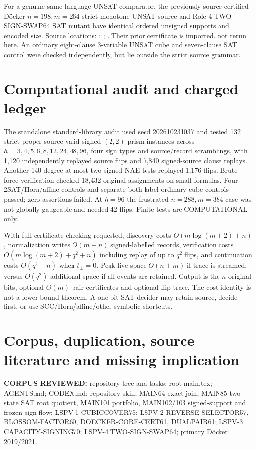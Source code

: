 \documentclass[11pt]{article}
\begin{document}
For a genuine same-language UNSAT comparator, the previously source-certified D\"ocker $n=198,m=264$ strict monotone UNSAT source and Role 4 TWO-SIGN-SWAP64 SAT mutant have identical ordered unsigned supports and encoded size. Source locations: ; ; . Their prior certificate is imported, not rerun here. An ordinary eight-clause 3-variable UNSAT cube and seven-clause SAT control were checked independently, but lie outside the strict source grammar.

\section{Computational audit and charged ledger}
The standalone standard-library audit used seed 202610231037 and tested 132 strict proper source-valid signed-$(2,2)$ prism instances across $h=3,4,5,6,8,12,24,48,96$, four sign types and source/record scramblings, with 1,120 independently replayed source flips and 7,840 signed-source clause replays. Another 140 degree-at-most-two signed NAE tests replayed 1,176 flips. Brute-force verification checked 18,432 original assignments on small formulas. Four 2SAT/Horn/affine controls and separate both-label ordinary cube controls passed; zero assertions failed. At $h=96$ the frustrated $n=288,m=384$ case was not globally gaugeable and needed 42 flips. Finite tests are COMPUTATIONAL only.

With full certificate checking requested, discovery costs $O(m\log(m+2)+n)$, normalization writes $O(m+n)$ signed-labelled records, verification costs $O(m\log(m+2)+q^2+n)$ including replay of up to $q^2$ flips, and continuation costs $O(q^2+n)$ when $t_\pm=0$. Peak live space $O(n+m)$ if trace is streamed, versus $O(q^2)$ additional space if all events are retained. Output is the $n$ original bits, optional $O(m)$ pair certificates and optional flip trace. The cost identity is not a lower-bound theorem. A one-bit SAT decider may retain source, decide first, or use SCC/Horn/affine/other symbolic shortcuts.

\section{Corpus, duplication, source literature and missing implication}
\textbf{CORPUS REVIEWED:} repository tree and tasks; root main.tex; AGENTS.md; CODEX.md; repository skill; MAIN64 exact join, MAIN85 two-state SAT root quotient, MAIN101 portfolio, MAIN102/103 signed-support and frozen-sign-flow; LSPV-1 CUBICCOVER75; LSPV-2 REVERSE-SELECTOR57, BLOSSOM-FACTOR60, DOECKER-CORE-CERT61, DUALPAIR61; LSPV-3 CAPACITY-SIGNING70; LSPV-4 TWO-SIGN-SWAP64; primary D\"ocker 2019/2021.
\end{document}
